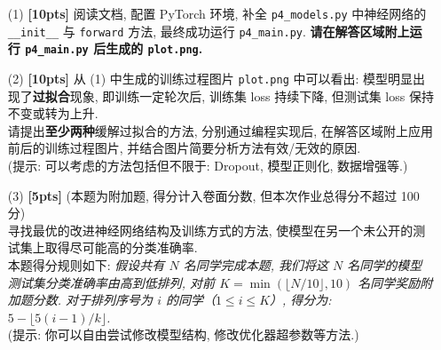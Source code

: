 \documentclass[a4paper,UTF8]{article}
\numberwithin{equation}{section}
\theoremstyle{definition}
\begin{document}
\begin{enumerate}
    \item [(1)] \textbf{[10pts]} 阅读文档, 配置 PyTorch 环境, 补全 \texttt{p4\_models.py} 中神经网络的 \texttt{\_\_init\_\_} 与 \texttt{forward} 方法, 最终成功运行 \texttt{p4\_main.py}. \textbf{请在解答区域附上运行 \texttt{p4\_main.py} 后生成的 \texttt{plot.png}.}
    \item [(2)] \textbf{[10pts]} 从 (1) 中生成的训练过程图片 \texttt{plot.png} 中可以看出: 模型明显出现了\textbf{过拟合}现象, 即训练一定轮次后, 训练集 loss 持续下降, 但测试集 loss 保持不变或转为上升. \\请提出\textbf{至少两种}缓解过拟合的方法, 分别通过编程实现后, 在解答区域附上应用前后的训练过程图片, 并结合图片简要分析方法有效/无效的原因.\\(提示: 可以考虑的方法包括但不限于: Dropout, 模型正则化, 数据增强等.)
    \item [(3)] \textbf{[5pts]} (本题为附加题, 得分计入卷面分数, 但本次作业总得分不超过 100 分)\\
    寻找最优的改进神经网络结构及训练方式的方法, 使模型在另一个未公开的测试集上取得尽可能高的分类准确率.\\本题得分规则如下: \textit{假设共有 $N$ 名同学完成本题, 我们将这 $N$ 名同学的模型测试集分类准确率由高到低排列, 对前 $K=\min\left(\lfloor N/10\rfloor, 10\right)$ 名同学奖励附加题分数. 对于排列序号为 $i$ 的同学（$1 \leq i \leq K$）, 得分为: $5 - \lfloor 5(i-1)/k \rfloor$.}\\
    (提示: 你可以自由尝试修改模型结构, 修改优化器超参数等方法.)
\end{enumerate}
\end{document}
